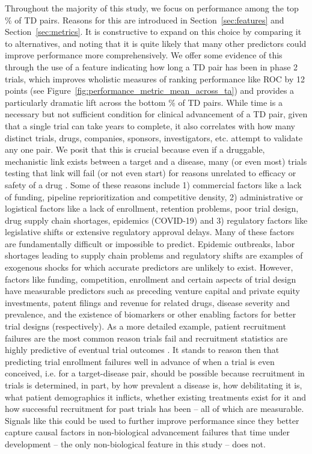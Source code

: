 \documentclass{article}
\begin{document}
Throughout the majority of this study, we focus on performance among the top \topRankingPct\% of TD pairs. Reasons for this are introduced in Section~\ref{sec:features} and Section~\ref{sec:metrics}. It is constructive to expand on this choice by comparing it to alternatives, and noting that it is quite likely that many other predictors could improve performance more comprehensively. We offer some evidence of this through the use of a feature indicating how long a TD pair has been in phase 2 trials, which improves wholistic measures of ranking performance like ROC by 12 points (see Figure~\ref{fig:performance_metric_mean_across_ta}) and provides a particularly dramatic lift across the bottom \bottomRankingPct\% of TD pairs. While time is a necessary but not sufficient condition for clinical advancement of a TD pair, given that a single trial can take years to complete, it also correlates with how many distinct trials, drugs, companies, sponsors, investigators, etc. attempt to validate any one pair. We posit that this is crucial because even if a druggable, mechanistic link exists between a target and a disease, many (or even most) trials testing that link will fail (or not even start) for reasons unrelated to efficacy or safety of a drug \cite{Razuvayevskaya2023.02.07.23285407}. Some of these reasons include 1) commercial factors like a lack of funding, pipeline reprioritization and competitive density, 2) administrative or logistical factors like a lack of enrollment, retention problems, poor trial design, drug supply chain shortages, epidemics (COVID-19) and 3) regulatory factors like legislative shifts or extensive regulatory approval delays. Many of these factors are fundamentally difficult or impossible to predict. Epidemic outbreaks, labor shortages leading to supply chain problems and regulatory shifts are examples of exogenous shocks for which accurate predictors are unlikely to exist. However, factors like funding, competition, enrollment and certain aspects of trial design have measurable predictors such as preceding venture capital and private equity investments, patent filings and revenue for related drugs, disease severity and prevalence, and the existence of biomarkers or other enabling factors for better trial designs (respectively). As a more detailed example, patient recruitment failures are the most common reason trials fail \cite{Razuvayevskaya2023.02.07.23285407} and recruitment statistics are highly predictive of eventual trial outcomes \cite{Lo2019Machine,PMID:34430930}. It stands to reason then that predicting trial enrollment failures well in advance of when a trial is even conceived, i.e. for a target-disease pair, should be possible because recruitment in trials is determined, in part, by how prevalent a disease is, how debilitating it is, what patient demographics it inflicts, whether existing treatments exist for it and how successful recruitment for past trials has been -- all of which are measurable. Signals like this could be used to further improve performance since they better capture causal factors in non-biological advancement failures that time under development -- the only non-biological feature in this study -- does not.
\end{document}
